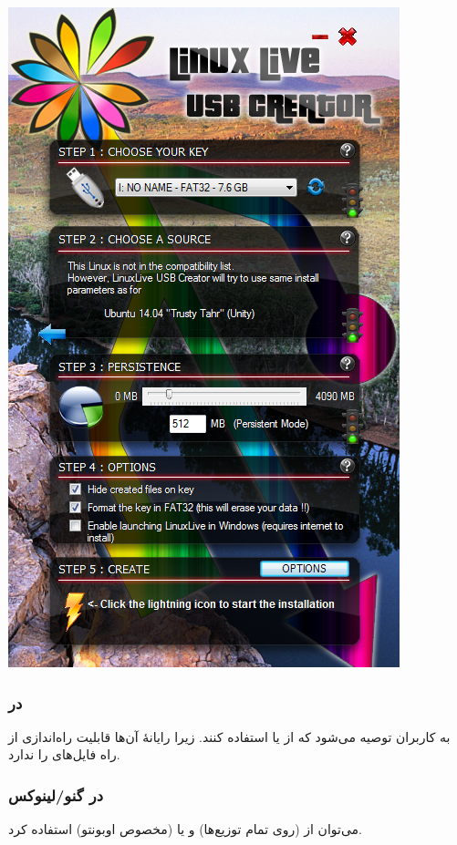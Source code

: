 \begin{center}
\includegraphics[scale=0.6]{pics/1.png}\\
\end{center}

\subsubsection{در }
به کاربران  توصیه می‌شود که از  یا  استفاده کنند. زیرا رایانهٔ  آن‌ها قابلیت راه‌اندازی از راه فایل‌های  را ندارد.

\subsubsection{در گنو/لینوکس}
می‌توان از  (روی تمام توزیع‌ها) و یا  (مخصوص اوبونتو) استفاده کرد.

